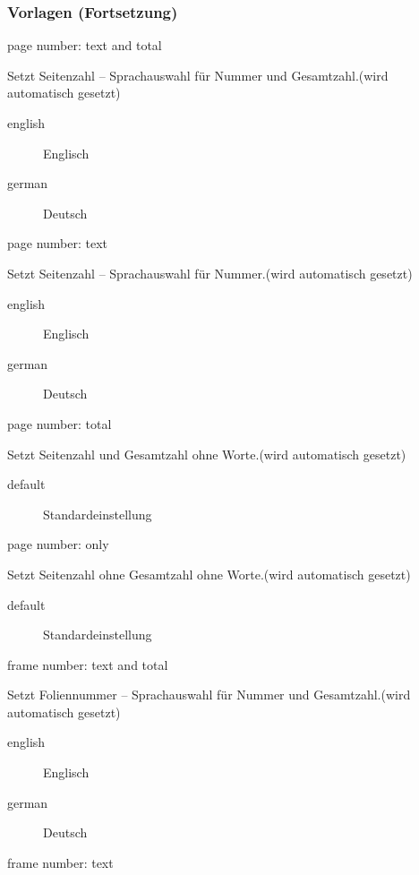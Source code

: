 \documentclass[presentation,t]{beamer}
\begin{document}
\begin{frame}[allowframebreaks]
\frametitle{Vorlagen (Fortsetzung)}
\label{sec-2-2-5}
\begin{block}{page number: text and total}
\label{sec-2-2-5-1}

Setzt Seitenzahl – Sprachauswahl für Nummer und Gesamtzahl.(wird automatisch gesetzt)
\begin{description}
\item[english] Englisch
\item[german] Deutsch
\end{description}
\end{block}
\begin{block}{page number: text}
\label{sec-2-2-5-2}

Setzt Seitenzahl – Sprachauswahl für Nummer.(wird automatisch gesetzt)
\begin{description}
\item[english] Englisch
\item[german] Deutsch
\end{description}
\end{block}
\begin{block}{page number: total}
\label{sec-2-2-5-3}

Setzt Seitenzahl und Gesamtzahl ohne Worte.(wird automatisch gesetzt)
\begin{description}
\item[default] Standardeinstellung
\end{description}
\end{block}
\begin{block}{page number: only}
\label{sec-2-2-5-4}

Setzt Seitenzahl ohne Gesamtzahl ohne Worte.(wird automatisch gesetzt)
\begin{description}
\item[default] Standardeinstellung
\end{description}
\end{block}
\begin{block}{frame number: text and total}
\label{sec-2-2-5-5}

Setzt Foliennummer – Sprachauswahl für Nummer und Gesamtzahl.(wird automatisch gesetzt)
\begin{description}
\item[english] Englisch
\item[german] Deutsch
\end{description}
\end{block}
\begin{block}{frame number: text}
\label{sec-2-2-5-6}


\end{block}
\end{frame}
\end{document}
